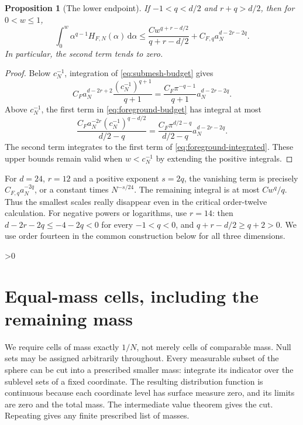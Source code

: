 \documentclass[11pt,a4paper]{article}
\newtheorem{proposition}[theorem]{Proposition}
\theoremstyle{definition}
\newcommand{\dd}{\,\mathrm d}
\numberwithin{equation}{section}
\let\originalsection\section
\renewcommand{\section}{\ifnum\value{section}>0\clearpage\fi\originalsection}
\begin{document}
\begin{proposition}[The lower endpoint]\label{prop:foreground-endpoint}
If $-1<q<d/2$ and $r+q>d/2$, then for $0<w\le1$,
\begin{equation}\label{eq:foreground-integrated}
 \int_0^w\alpha^{q-1}H_{F,N}(\alpha)\dd\alpha
 \le \frac{Cw^{q+r-d/2}}{q+r-d/2}
                 +C_{F,q}a_N^{d-2r-2q}.
\end{equation}
In particular, the second term tends to zero.
\end{proposition}
\begin{proof}
Below $c_N^{-1}$, integration of \eqref{eq:submesh-budget} gives
\[
 C_Fa_N^{d-2r+2}\frac{(c_N^{-1})^{q+1}}{q+1}
       =\frac{C_F\pi^{-q-1}}{q+1}a_N^{d-2r-2q}.
\]
Above $c_N^{-1}$, the first term in \eqref{eq:foreground-budget} has integral at most
\[
 \frac{C_Fa_N^{-2r}(c_N^{-1})^{q-d/2}}{d/2-q}
       =\frac{C_F\pi^{d/2-q}}{d/2-q}a_N^{d-2r-2q}.
\]
The second term integrates to the first term of \eqref{eq:foreground-integrated}. These upper bounds remain valid when $w<c_N^{-1}$ by extending the positive integrals.
\end{proof}

For $d=24$, $r=12$ and a positive exponent $s=2q$, the vanishing term is precisely $C_{F,q}a_N^{-2q}$, or a constant times $N^{-s/24}$. The remaining integral is at most $Cw^q/q$. Thus the smallest scales really disappear even in the critical order-twelve calculation. For negative powers or logarithms, use $r=14$: then $d-2r-2q\le-4-2q<0$ for every $-1<q<0$, and $q+r-d/2\ge q+2>0$. We use order fourteen in the common construction below for all three dimensions.

\section{Equal-mass cells, including the remaining mass}\label{sec:cells}
We require cells of mass exactly $1/N$, not merely cells of comparable mass. Null sets may be assigned arbitrarily throughout. Every measurable subset of the sphere can be cut into a prescribed smaller mass: integrate its indicator over the sublevel sets of a fixed coordinate. The resulting distribution function is continuous because each coordinate level has surface measure zero, and its limits are zero and the total mass. The intermediate value theorem gives the cut. Repeating gives any finite prescribed list of masses.
\end{document}
